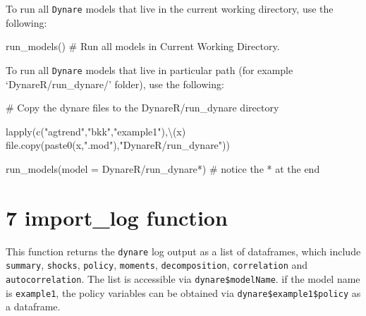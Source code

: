 \documentclass[
  12pt,
  legalpaperpaper,
  DIV=11,
  numbers=noendperiod]{scrartcl}
\newenvironment{Shaded}{\begin{snugshade}}{\end{snugshade}}
\newcommand{\AttributeTok}[1]{\textcolor[rgb]{0.40,0.45,0.13}{#1}}
\newcommand{\CommentTok}[1]{\textcolor[rgb]{0.37,0.37,0.37}{#1}}
\newcommand{\FunctionTok}[1]{\textcolor[rgb]{0.28,0.35,0.67}{#1}}
\newcommand{\NormalTok}[1]{\textcolor[rgb]{0.00,0.23,0.31}{#1}}
\newcommand{\SpecialCharTok}[1]{\textcolor[rgb]{0.37,0.37,0.37}{#1}}
\newcommand{\StringTok}[1]{\textcolor[rgb]{0.13,0.47,0.30}{#1}}
\begin{document}
To run all \texttt{Dynare} models that live in the current working
directory, use the following:

\begin{Shaded}
\begin{Highlighting}[]
\FunctionTok{run\_models}\NormalTok{() }\CommentTok{\# Run all models in Current Working Directory.}
\end{Highlighting}
\end{Shaded}

To run all \texttt{Dynare} models that live in particular path (for
example `DynareR/run\_dynare/' folder), use the following:

\begin{Shaded}
\begin{Highlighting}[]
\CommentTok{\# Copy the dynare files to the \textquotesingle{}DynareR/run\_dynare\textquotesingle{} directory}

\FunctionTok{lapply}\NormalTok{(}\FunctionTok{c}\NormalTok{(}\StringTok{"agtrend"}\NormalTok{,}\StringTok{"bkk"}\NormalTok{,}\StringTok{"example1"}\NormalTok{),\textbackslash{}(x) }\FunctionTok{file.copy}\NormalTok{(}\FunctionTok{paste0}\NormalTok{(x,}\StringTok{".mod"}\NormalTok{),}\StringTok{"DynareR/run\_dynare"}\NormalTok{))}

\FunctionTok{run\_models}\NormalTok{(}\AttributeTok{model =} \StringTok{\textquotesingle{}DynareR/run\_dynare*\textquotesingle{}}\NormalTok{) }\CommentTok{\# notice the * at the end}
\end{Highlighting}
\end{Shaded}

\hypertarget{import_log-function}{%
\section{7 import\_log function}\label{import_log-function}}

This function returns the \texttt{dynare} log output as a list of
dataframes, which include \texttt{summary}, \texttt{shocks},
\texttt{policy}, \texttt{moments}, \texttt{decomposition},
\texttt{correlation} and \texttt{autocorrelation}. The list is
accessible via \texttt{dynare\$modelName}. if the model name is
\texttt{example1}, the policy variables can be obtained via
\texttt{dynare\$example1\$policy} as a dataframe.

\begin{Shaded}
\end{Shaded}
\end{document}
